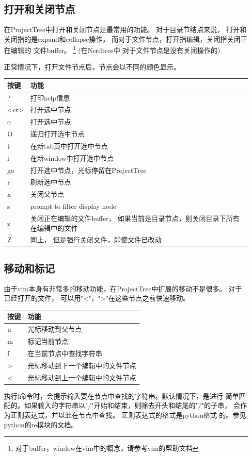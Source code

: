\documentclass[oneside,openany]{book}
\begin{document}
  \subsection{打开和关闭节点}
  在ProjectTree中打开和关闭节点是最常用的功能。 对于目录节结点来说，
打开和关闭指的是expand和collapse操作， 而对于文件节点，打开指编辑，关闭指关闭正在编辑的
文件buffer。 \footnote{对于buffer，window在vim中的概念，请参考vim的帮助文档} (在Nerdtree中
对于文件节点是没有关闭操作的)
  
  正常情况下，打开文件节点后，节点会以不同的颜色显示。
  \begin{table}[H]
  \centering
      \begin{tabular}{p{40pt}p{220pt}}
        \toprule
        按键& 功能\\
        \midrule
          ?     &打印help信息\\
          <cr>  &打开选中节点\\
          o     &打开选中节点\\
          O     &递归打开选中节点\\
          t     &在新tab页中打开选中节点\\
          i     &在新window中打开选中节点\\
          go    &打开选中节点，光标停留在ProjectTree\\
          r     &刷新选中节点\\
          x     &关闭父节点\\
          s     &prompt to filter display node\\
          z     &关闭正在编辑的文件buffer， 如果当前是目录节点，则关闭目录下所有在编辑中的文件\\
          Z     &同上， 但是强行关闭文件，即使文件已改动\\
      \bottomrule
      \end{tabular}
  \end{table}

  \subsection{移动和标记}
  由于vim本身有非常多的移动功能，在ProjectTree中扩展的移动不是很多。 对于已经打开的文件，
可以用"<"，">"在这些节点之前快速移动。
  \begin{table}[H]
  \centering
      \begin{tabular}{p{40pt}p{220pt}}
        \toprule
        按键& 功能\\
        \midrule
          u     &光标移动到父节点\\
          m     &标记当前节点\\
          f     &在当前节点中查找字符串\\
          >     &光标移动到下一个编辑中的文件节点\\
          <     &光标移动到上一个编辑中的文件节点\\
      \bottomrule
      \end{tabular}
  \end{table}
  执行f命令时，会提示输入要在节点中查找的字符串。默认情况下，是进行
简单匹配的。如果输入的字符串以"/"开始和结束，则除去开头和结尾的"/"的子串，
会作为正则表达式，并以此在节点中查找。 正则表达式的格式是python格式
的。参见python的re模块的文档。
\end{document}
